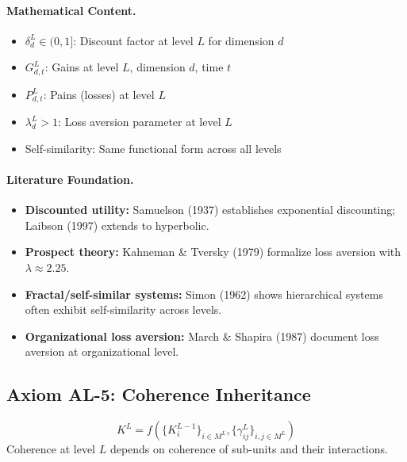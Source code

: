 \paragraph{Mathematical Content.}
\begin{itemize}
\item $\delta^L_d \in (0,1]$: Discount factor at level $L$ for dimension $d$
\item $G^L_{d,t}$: Gains at level $L$, dimension $d$, time $t$
\item $P^L_{d,t}$: Pains (losses) at level $L$
\item $\lambda^L_d > 1$: Loss aversion parameter at level $L$
\item Self-similarity: Same functional form across all levels
\end{itemize}

\paragraph{Literature Foundation.}
\begin{itemize}
\item \textbf{Discounted utility:} Samuelson (1937) establishes exponential 
discounting; Laibson (1997) extends to hyperbolic.
\item \textbf{Prospect theory:} Kahneman \& Tversky (1979) formalize loss 
aversion with $\lambda \approx 2.25$.
\item \textbf{Fractal/self-similar systems:} Simon (1962) shows hierarchical 
systems often exhibit self-similarity across levels.
\item \textbf{Organizational loss aversion:} March \& Shapira (1987) document 
loss aversion at organizational level.
\end{itemize}

\subsection{Axiom AL-5: Coherence Inheritance}

\begin{tcolorbox}[colback=gray!5!white, colframe=gray!75!black, title=Axiom AL-5: Coherence Inheritance]
\begin{equation}
\boxed{
K^L = f\left( \{K^{L-1}_i\}_{i \in M^L}, \{\gamma^L_{ij}\}_{i,j \in M^L} \right)
}
\end{equation}
Coherence at level $L$ depends on coherence of sub-units and their interactions.
\end{tcolorbox}

